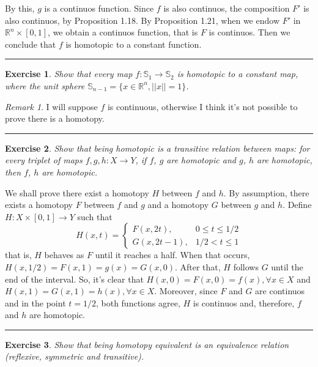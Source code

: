\documentclass[a4paper,11pt]{article}
\newcommand{\linia}{\rule{\linewidth}{0.5pt}}
\theoremstyle{mytheor}
\theoremstyle{mytheor}
\newtheorem{exercise}{Exercise}
\theoremstyle{remark}
\newtheorem*{remark}{Remark}
\newcommand{\R}{\mathbb{R}}
\begin{document}
By this, $g$ is a continuos function. Since $f$ is also continuos, the
composition $F'$ is also continuos, by Proposition 1.18. By Proposition 1.21,
when we endow $F'$ in $\R^n \times [0,1]$, we obtain a continuos function,
that is $F$ is continuos. Then we conclude that $f$ is homotopic to a constant
function. 

\noindent\linia

\begin{exercise}
    Show that every map $f : \mathbb{S}_1 \to \mathbb{S}_2$ is homotopic to a
    constant map, where the unit sphere $\mathbb{S}_{n-1} = \{x \in \R^n,
    ||x|| = 1\}$. 
\end{exercise}

\begin{remark}
    I will suppose $f$ is continuous, otherwise I think it's not possible to
    prove there is a homotopy.     
\end{remark}

\noindent\linia

\begin{exercise}
    Show that being homotopic is a transitive relation between maps: for every
    triplet of maps $f, g, h: X \to Y$, if $f$, $g$ are homotopic and $g$, $h$
    are homotopic, then $f$, $h$ are homotopic.
\end{exercise}

We shall prove there exist a homotopy $H$ between $f$ and $h$. By assumption,
there exists a homotopy $F$ between $f$ and $g$ and a homotopy $G$ between $g$
and $h$. Define $H: X \times [0,1] \to Y$ such that 
$$
H(x,t) = \begin{cases}
    F(x,2t), &0 \le t \le 1/2 \\
    G(x,2t - 1), &1/2 < t \le 1   
\end{cases}
$$
that is, $H$ behaves as $F$ until it reaches a half. When that occurs,
$H(x,1/2) = F(x,1) = g(x) = G(x, 0)$. After that, $H$ follows $G$ until the
end of the interval. So, it's clear that $H(x,0) = F(x,0) = f(x), \forall x
\in X$ and $H(x,1) = G(x,1) = h(x), \forall x \in X$. Moreover, since $F$ and
$G$ are continuos and in the point $t = 1/2$, both functions agree, $H$ is
continuos and, therefore, $f$ and $h$ are homotopic. 

\noindent\linia

\begin{exercise}
    Show that being homotopy equivalent is an equivalence relation (reflexive,
    symmetric and transitive).
\end{exercise}
\end{document}
